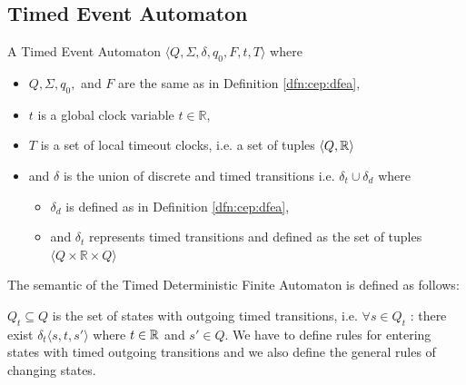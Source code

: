 		\subsection{Timed Event Automaton}
			\begin{dfn}
				\label{dfn:cep:TEA}
				A Timed Event Automaton $\langle Q,\Sigma,\delta,q_0, F, t, T \rangle$ where
				\begin{itemize}
					\item $Q, \Sigma, q_0,$ and $F$ are the same as in Definition \ref{dfn:cep:dfea},
					\item $t$ is a global clock variable $t \in \mathbb{R}$,
					\item $T$ is a set of local timeout clocks, i.e. a set of tuples $\langle Q, \mathbb{R} \rangle$
					\item and $\delta$ is the union of discrete and timed transitions i.e. $\delta_t \cup \delta_d$ where
					\begin{itemize}
						\item $\delta_d$ is defined as in Definition \ref{dfn:cep:dfea},
						\item and $\delta_t$ represents timed transitions and defined as the set of tuples $\langle Q \times \mathbb{R} \times Q \rangle$ 
					\end{itemize}
				\end{itemize}
			\end{dfn}
			
			The semantic of the Timed Deterministic Finite Automaton is defined as follows:
			
			$Q_t \subseteq Q$ is the set of states with outgoing timed transitions, 
			i.e. $\forall s \in Q_t$ : there exist $ \delta_t\langle s, t, s' \rangle$ where $t \in \mathbb{R}$ and $s' \in Q$.
			We have to define rules for entering states with timed outgoing transitions and we also define the general rules of changing states. 
			
